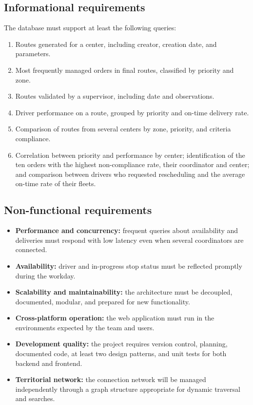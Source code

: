 \documentclass[12pt,a4paper]{article}
\begin{document}
\subsection{Informational requirements}
The database must support at least the following queries:
\begin{enumerate}
\item Routes generated for a center, including creator, creation date, and parameters.
\item Most frequently managed orders in final routes, classified by priority and zone.
\item Routes validated by a supervisor, including date and observations.
\item Driver performance on a route, grouped by priority and on-time delivery rate.
\item Comparison of routes from several centers by zone, priority, and criteria compliance.
\item Correlation between priority and performance by center; identification of the ten orders with the highest non-compliance rate, their coordinator and center; and comparison between drivers who requested rescheduling and the average on-time rate of their fleets.
\end{enumerate}

\subsection{Non-functional requirements}
\begin{itemize}
\item \textbf{Performance and concurrency:} frequent queries about availability and deliveries must respond with low latency even when several coordinators are connected.
\item \textbf{Availability:} driver and in-progress stop status must be reflected promptly during the workday.
\item \textbf{Scalability and maintainability:} the architecture must be decoupled, documented, modular, and prepared for new functionality.
\item \textbf{Cross-platform operation:} the web application must run in the environments expected by the team and users.
\item \textbf{Development quality:} the project requires version control, planning, documented code, at least two design patterns, and unit tests for both backend and frontend.
\item \textbf{Territorial network:} the connection network will be managed independently through a graph structure appropriate for dynamic traversal and searches.
\end{itemize}
\end{document}

